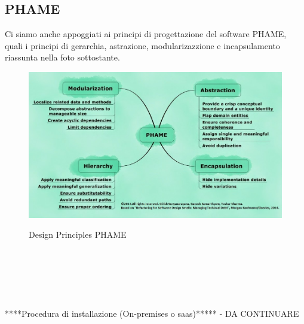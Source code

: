 \documentclass{article}
\begin{document}
\subsection{PHAME} 
Ci siamo anche appoggiati ai principi di progettazione del software PHAME, quali i principi di gerarchia, astrazione, modularizazzione e incapsulamento riassunta nella foto sottostante.
\begin{figure}[h!]
\centering
\includegraphics[scale=0.4]{PHAME.jpg}
\label{fig:PHAME}
\caption{Design Principles PHAME}
\end{figure}
\\
\\
\\
\\
\\
****Procedura di installazione (On-premises o saas)***** - DA CONTINUARE
\end{document}
